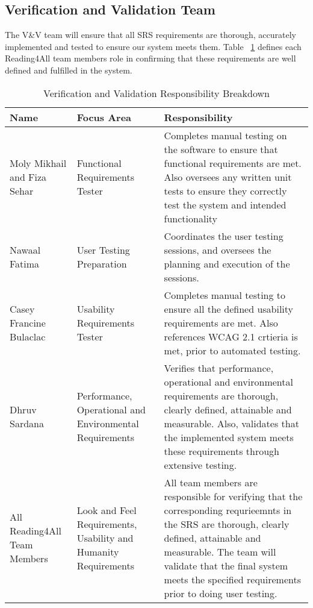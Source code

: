 \documentclass[12pt, titlepage]{article}
\begin{document}
\subsection{Verification and Validation Team}


The V\&V team will ensure that all SRS requirements are thorough, accurately implemented and tested to ensure our system meets them. 
Table ~\ref{tab:data-dictionary-reading4all} defines each Reading4All team members role in confirming that these requirements are well defined and fulfilled in the system.

\begin{table}[H]
    \centering
    \caption{Verification and Validation Responsibility Breakdown}
    \label{tab:data-dictionary-reading4all}
    \begin{tabular}{ |p{3.0cm}|p{3.8cm}|p{7.3cm}| }
      \hline
      \textbf{Name} & \textbf{ Focus Area } & \textbf{Responsibility} \\
      \hline
      Moly Mikhail and Fiza Sehar & Functional Requirements Tester & Completes manual testing on the software to ensure that functional requirements are met. Also oversees any written unit tests to ensure they correctly test the system and intended functionality \\
      \hline
      Nawaal Fatima & User Testing Preparation & Coordinates the user testing sessions, and oversees the planning and execution of the sessions. \\
      \hline 
      Casey Francine Bulaclac & Usability Requirements Tester & Completes manual testing to ensure all the defined usability requirements are met. Also references WCAG 2.1 crtieria is met, prior to automated testing. \\
      \hline 
      Dhruv Sardana & Performance, Operational and Environmental Requirements & Verifies that performance, operational and environmental requirements are thorough, clearly defined, attainable and measurable. Also, validates that the implemented system meets these requirements through extensive testing.  \\
      \hline 
      All Reading4All Team Members & Look and Feel Requirements, Usability and Humanity Requirements & All team members are responsible for verifying that the corresponding requrieemnts in the SRS are thorough, clearly defined, attainable and measurable. The team will validate that the final system meets the specified requirements prior to doing user testing. \\

\end{tabular}
\end{table}
\end{document}
